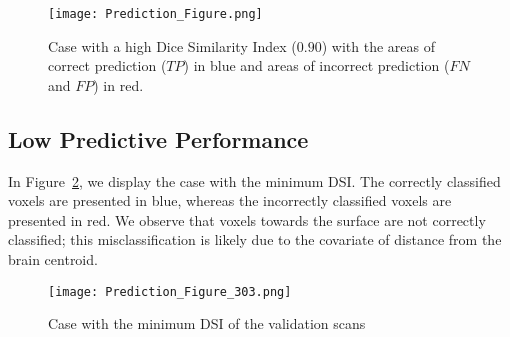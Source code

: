 \documentclass[12pt]{report}
\begin{document}
\begin{refsection}
\begin{figure}[htbp]
\centering
    \texttt{[image: Prediction\_Figure.png]}
\caption{Case with a high Dice Similarity Index ($0.90$) with the areas of correct prediction ($TP$) in blue and areas of incorrect prediction ($FN$ and $FP$) in red. }
\label{fig:good_case}
\end{figure}    

\subsection{Low Predictive Performance}
In Figure~\ref{fig:bad_case}, we display the case with the minimum DSI.  The correctly classified voxels are presented in blue, whereas the incorrectly classified voxels are presented in red.  We observe that voxels towards the surface are not correctly classified; this misclassification is likely due to the covariate of distance from the brain centroid.  

\begin{figure}[htbp]
\centering
    \texttt{[image: Prediction\_Figure\_303.png]}
\caption{Case with the minimum DSI of the validation scans}
\label{fig:bad_case}
\end{figure}    

%
%


\end{refsection}
\end{document}
